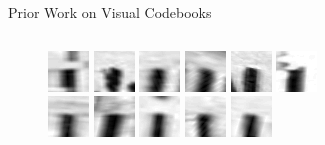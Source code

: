 \documentclass[mathserif]{beamer}
\begin{document}
\begin{frame}{Prior Work on Visual Codebooks}
\begin{columns}
\begin{column}{.5\textwidth}
\begin{figure}
            \end{figure}
            \begin{figure}
                \includegraphics[width=.5cm]{illustrations/related_work/video_google/video_google_dict2_1}
                \includegraphics[width=.5cm]{illustrations/related_work/video_google/video_google_dict2_2}
                \includegraphics[width=.5cm]{illustrations/related_work/video_google/video_google_dict2_3}
                \includegraphics[width=.5cm]{illustrations/related_work/video_google/video_google_dict2_4}
                \includegraphics[width=.5cm]{illustrations/related_work/video_google/video_google_dict2_5}
                \includegraphics[width=.5cm]{illustrations/related_work/video_google/video_google_dict2_6}\\
                \includegraphics[width=.5cm]{illustrations/related_work/video_google/video_google_dict2_7}
                \includegraphics[width=.5cm]{illustrations/related_work/video_google/video_google_dict2_8}
                \includegraphics[width=.5cm]{illustrations/related_work/video_google/video_google_dict2_9}
                \includegraphics[width=.5cm]{illustrations/related_work/video_google/video_google_dict2_10}
                \includegraphics[width=.5cm]{illustrations/related_work/video_google/video_google_dict2_11}

\end{figure}
\end{column}
\end{columns}
\end{frame}
\end{document}
